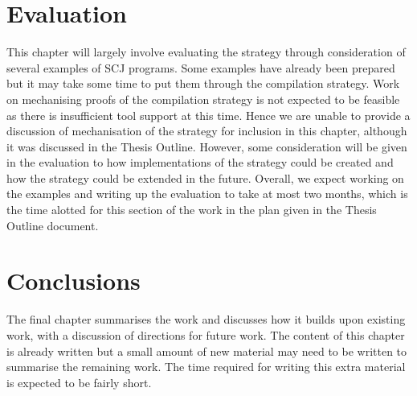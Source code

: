 \documentclass[a4paper,12pt]{article}
\begin{document}
\section{Evaluation}

This chapter will largely involve evaluating the strategy through
consideration of several examples of SCJ programs.
Some examples have already been prepared but it may take some time to
put them through the compilation strategy.
Work on mechanising proofs of the compilation strategy is not expected
to be feasible as there is insufficient tool support at this time.
Hence we are unable to provide a discussion of mechanisation of the
strategy for inclusion in this chapter, although it was discussed in
the Thesis Outline.
However, some consideration will be given in the evaluation to how
implementations of the strategy could be created and how the strategy
could be extended in the future.
Overall, we expect working on the examples and writing up the
evaluation to take at most two months, which is the time alotted for
this section of the work in the plan given in the Thesis Outline
document.

\section{Conclusions}

The final chapter summarises the work and discusses how it builds upon
existing work, with a discussion of directions for future work.
The content of this chapter is already written but a small amount of
new material may need to be written to summarise the remaining work.
The time required for writing this extra material is expected to be
fairly short.
\end{document}

